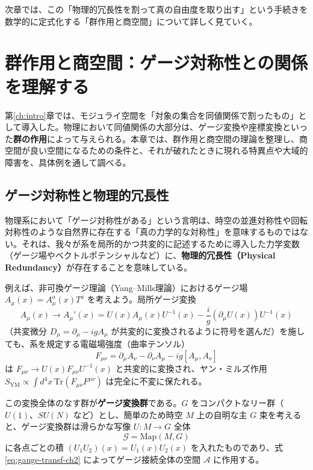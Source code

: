 \documentclass[uplatex, dvipdfmx, book]{jsbook}
\let\origsection\section
\let\origsubsection\subsection
\let\origsubsubsection\subsubsection
\newcommand{\chapter}{\origsection}
\renewcommand{\section}{\origsubsection}
\renewcommand{\subsection}{\origsubsubsection}
\renewcommand{\subsubsection}{\paragraph}
\begin{document}
次章では、この「物理的冗長性を割って真の自由度を取り出す」という手続きを数学的に定式化する「群作用と商空間」について詳しく見ていく。

\chapter{群作用と商空間：ゲージ対称性との関係を理解する}
\label{ch:group-action}

第\ref{ch:intro}章では、モジュライ空間を「対象の集合を同値関係で割ったもの」として導入した。物理において同値関係の大部分は、ゲージ変換や座標変換といった\textbf{群の作用}によって与えられる。本章では、群作用と商空間の理論を整理し、商空間が良い空間になるための条件と、それが破れたときに現れる特異点や大域的障害を、具体例を通して調べる。

\section{ゲージ対称性と物理的冗長性}

物理系において「ゲージ対称性がある」という言明は、時空の並進対称性や回転対称性のような自然界に存在する「真の力学的な対称性」を意味するものではない。それは、我々が系を局所的かつ共変的に記述するために導入した力学変数（ゲージ場やベクトルポテンシャルなど）に、\textbf{物理的冗長性（Physical Redundancy）}が存在することを意味している。

例えば、非可換ゲージ理論（Yang--Mills理論）におけるゲージ場 $A_\mu(x) = A_\mu^a(x) T^a$ を考えよう。局所ゲージ変換
\begin{equation}
    A_\mu(x) \to A_\mu'(x) = U(x) A_\mu(x) U^{-1}(x) - \frac{i}{g} (\partial_\mu U(x)) U^{-1}(x)
    \label{eq:gauge-transf-ch2}
\end{equation}
（共変微分 $D_\mu = \partial_\mu - igA_\mu$ が共変的に変換されるように符号を選んだ）を施しても、系を規定する電磁場強度（曲率テンソル）
\begin{equation}
    F_{\mu\nu} = \partial_\mu A_\nu - \partial_\nu A_\mu - ig [A_\mu, A_\nu]
\end{equation}
は $F_{\mu\nu} \to U(x) F_{\mu\nu} U^{-1}(x)$ と共変的に変換され、ヤン・ミルズ作用 $S_{\text{YM}} \propto \int d^4x \, \text{Tr}(F_{\mu\nu}F^{\mu\nu})$ は完全に不変に保たれる。

この変換全体のなす群が\textbf{ゲージ変換群}である。$G$ をコンパクトなリー群（$U(1)$、$SU(N)$ など）とし、簡単のため時空 $M$ 上の自明な主 $G$ 束を考えると、ゲージ変換群は滑らかな写像 $U: M \to G$ 全体
\begin{equation}
    \mathcal{G} = \mathrm{Map}(M, G)
\end{equation}
に各点ごとの積 $(U_1 U_2)(x) = U_1(x) U_2(x)$ を入れたものであり、式 \eqref{eq:gauge-transf-ch2} によってゲージ接続全体の空間 $\mathcal{A}$ に作用する。
\end{document}
